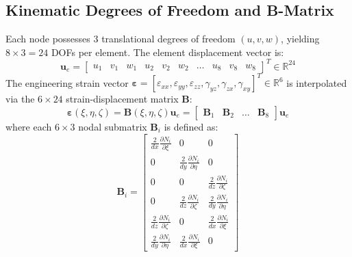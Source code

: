 \documentclass[11pt, a4paper]{article}
\begin{document}
\subsection{Kinematic Degrees of Freedom and B-Matrix}
Each node possesses 3 translational degrees of freedom $(u, v, w)$, yielding $8 \times 3 = 24$ DOFs per element. The element displacement vector is:
\begin{equation}
\mathbf{u}_e = \begin{bmatrix} u_1 & v_1 & w_1 & u_2 & v_2 & w_2 & \dots & u_8 & v_8 & w_8 \end{bmatrix}^T \in \mathbb{R}^{24}
\end{equation}
The engineering strain vector $\boldsymbol{\varepsilon} = [\varepsilon_{xx}, \varepsilon_{yy}, \varepsilon_{zz}, \gamma_{yz}, \gamma_{zx}, \gamma_{xy}]^T \in \mathbb{R}^6$ is interpolated via the $6 \times 24$ strain-displacement matrix $\mathbf{B}$:
\begin{equation}
\boldsymbol{\varepsilon}(\xi, \eta, \zeta) = \mathbf{B}(\xi, \eta, \zeta) \mathbf{u}_e = \begin{bmatrix} \mathbf{B}_1 & \mathbf{B}_2 & \dots & \mathbf{B}_8 \end{bmatrix} \mathbf{u}_e
\end{equation}
where each $6 \times 3$ nodal submatrix $\mathbf{B}_i$ is defined as:
\begin{equation}
\mathbf{B}_i = \begin{bmatrix}
\frac{2}{dx} \frac{\partial N_i}{\partial \xi} & 0 & 0 \\[3pt]
0 & \frac{2}{dy} \frac{\partial N_i}{\partial \eta} & 0 \\[3pt]
0 & 0 & \frac{2}{dz} \frac{\partial N_i}{\partial \zeta} \\[3pt]
0 & \frac{2}{dz} \frac{\partial N_i}{\partial \zeta} & \frac{2}{dy} \frac{\partial N_i}{\partial \eta} \\[3pt]
\frac{2}{dz} \frac{\partial N_i}{\partial \zeta} & 0 & \frac{2}{dx} \frac{\partial N_i}{\partial \xi} \\[3pt]
\frac{2}{dy} \frac{\partial N_i}{\partial \eta} & \frac{2}{dx} \frac{\partial N_i}{\partial \xi} & 0
\end{bmatrix}
\end{equation}
\end{document}
